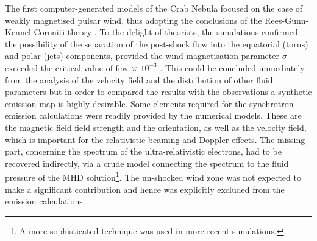 The first computer-generated models of the Crab Nebula focused on the case of weakly magnetised pulsar wind, thus adopting the conclusions of the Rees-Gunn-Kennel-Coroniti theory \citep{rees-gunn-74,kc84a,kc84b}.  To the delight of theorists, the simulations confirmed the possibility of the separation of the post-shock flow into the equatorial (torus)  and polar (jets) components, provided the wind magnetisation parameter $\sigma$ exceeded the critical value of few$ \,\times\, 10^{-3}$ \citep{ssk-lyub-03,ssk-lyub-04,delzanna-04,bogovalov-05}.  This could be concluded immediately from the analysis of the velocity field and the distribution of other fluid parameters but in order to compared the results with the observations a synthetic emission map is highly desirable. Some elements required for the synchrotron emission calculations were readily provided by the numerical models. These are the magnetic field field strength and the orientation, as well as the velocity field, which is important for the relativistic beaming and Doppler effects.   The missing part, concerning the spectrum of the ultra-relativistic electrons, had to be recovered indirectly, via a crude model connecting the spectrum to the fluid pressure of the MHD solution\footnote{A more sophisticated technique was used in more recent simulations. }.  The un-shocked wind zone was not expected to make a significant contribution and hence was explicitly excluded from the emission calculations.
